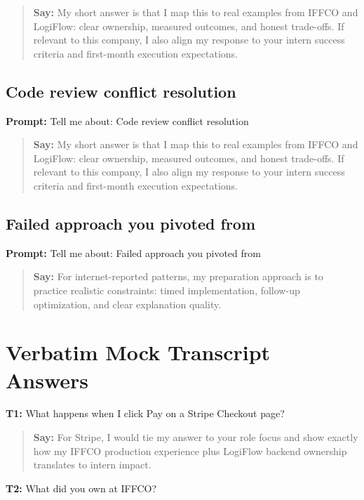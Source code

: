 \documentclass[9pt,a4paper]{article}
\begin{document}
\begin{quote}\small\textbf{Say:} My short answer is that I map this to real examples from IFFCO and LogiFlow: clear ownership, measured outcomes, and honest trade-offs. If relevant to this company, I also align my response to your intern success criteria and first-month execution expectations.\end{quote}
\vspace{2mm}
\subsection{Code review conflict resolution}
\textbf{Prompt:} Tell me about: Code review conflict resolution

\begin{quote}\small\textbf{Say:} My short answer is that I map this to real examples from IFFCO and LogiFlow: clear ownership, measured outcomes, and honest trade-offs. If relevant to this company, I also align my response to your intern success criteria and first-month execution expectations.\end{quote}
\vspace{2mm}
\subsection{Failed approach you pivoted from}
\textbf{Prompt:} Tell me about: Failed approach you pivoted from

\begin{quote}\small\textbf{Say:} For internet-reported patterns, my preparation approach is to practice realistic constraints: timed implementation, follow-up optimization, and clear explanation quality.\end{quote}
\vspace{2mm}
\newpage\section{Verbatim Mock Transcript Answers}
\textbf{T1:} What happens when I click Pay on a Stripe Checkout page?

\begin{quote}\small\textbf{Say:} For Stripe, I would tie my answer to your role focus and show exactly how my IFFCO production experience plus LogiFlow backend ownership translates to intern impact.\end{quote}
\vspace{2mm}
\textbf{T2:} What did you own at IFFCO?
\end{document}
